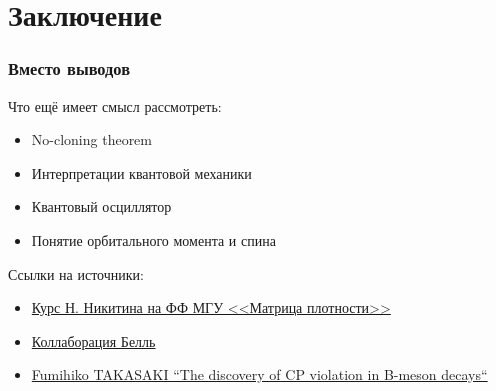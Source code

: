 \section{Заключение}
\begin{frame}
    \frametitle{Вместо выводов}
    Что ещё имеет смысл рассмотреть:
    \begin{itemize}
    \item No-cloning theorem
    \item Интерпретации квантовой механики
    \item Квантовый осциллятор
    \item Понятие орбитального момента и спина
    \end{itemize}
    Ссылки на источники:
    \begin{itemize}
    \item
    \href{https://www.youtube.com/playlist?list=PLcsjsqLLSfNAN4BP6Bzum-VP8jmPrW7td}
    {Курс Н. Никитина на ФФ МГУ <<Матрица плотности>>}
    \item \href{https://belle.kek.jp/}{Коллаборация Белль}
    \item \href{https://www.ncbi.nlm.nih.gov/pmc/articles/PMC3422684/}
    {Fumihiko TAKASAKI ``The discovery of CP violation in B-meson decays``}
    \end{itemize}
\end{frame}
